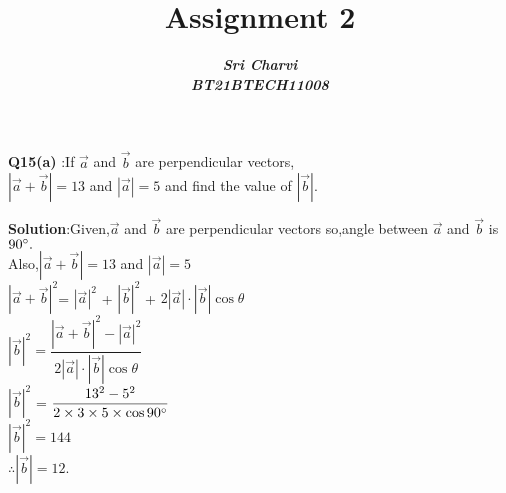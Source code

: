 \documentclass[journal,12pt,twocolumn]{IEEEtran}
\title{ Assignment 2}
\author{\textbf{\textit{Sri Charvi}}\\
\textbf{\textit{BT21BTECH11008}}}
\begin{document}
\maketitle
\textbf{Q15(a) }:If $\vec{a}$ and $\vec{b}$ are perpendicular vectors,\\
$| \vec{a}+\vec{b}| = 13$ and $| \vec{a}| = 5$ and find the value of 
$|\vec{b}|$.

\medskip
\textbf{Solution}:Given,$\vec{a}$ and $\vec{b}$ are perpendicular vectors so,angle between $\vec{a}$ and $\vec{b}$ is $90\degree.$\\
Also,$|\vec{a}+\vec{b}| = 13$ and $|\vec{a}|= 5$\\

$|\vec{a}+\vec{b}|^2$= $|\vec{a}|^2$ +
 $|\vec{b}|^2$ + $2 |\vec{a}| \cdot |\vec{b}| \cos\theta $\\
 
 $|\vec{b}|^2=  \dfrac{|\vec{a}+\vec{b}|^2 - |\vec{a}|^2}
 {2 |\vec{a}| \cdot |\vec{b}| \cos\theta}$\\
 
 
 $|\vec{b}|^2$ = $\dfrac{13^2 - 5^2}{2\times3 \times 5 \times \cos90\degree}$\\
 
  $|\vec{b}|^2 = 144$\\
  
 $\therefore |\vec{b}| = 12.$
  
  
 
 
 
 
\end{document}
